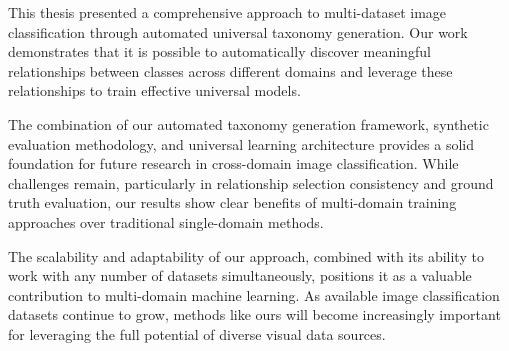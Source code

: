 This thesis presented a comprehensive approach to multi-dataset image classification
through automated universal taxonomy generation.
Our work demonstrates that it is possible to automatically discover
meaningful relationships between classes across different domains
and leverage these relationships to train effective universal models.

The combination of our automated taxonomy generation framework,
synthetic evaluation methodology,
and universal learning architecture provides a solid foundation
for future research in cross-domain image classification.
While challenges remain, particularly in relationship selection consistency
and ground truth evaluation,
our results show clear benefits of multi-domain training approaches
over traditional single-domain methods.

The scalability and adaptability of our approach,
combined with its ability to work with any number of datasets simultaneously,
positions it as a valuable contribution to multi-domain machine learning.
As available image classification datasets continue to grow,
methods like ours will become increasingly important
for leveraging the full potential of diverse visual data sources.

